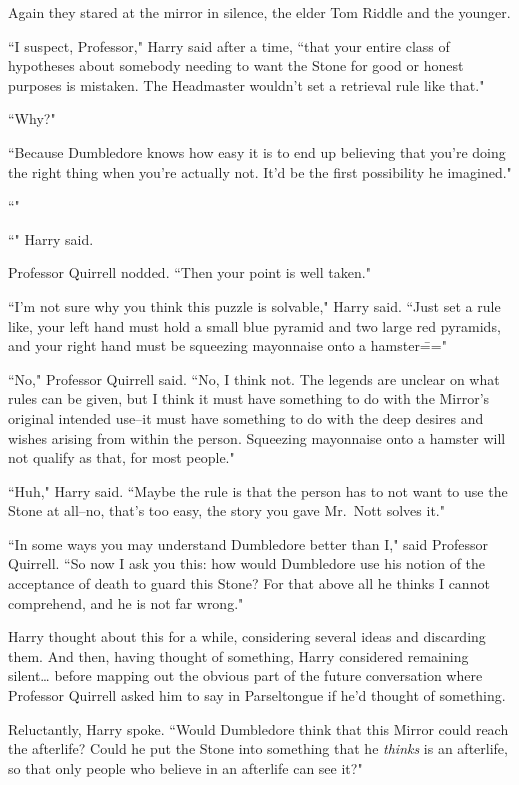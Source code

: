 Again they stared at the mirror in silence, the elder Tom Riddle and the younger.

``I suspect, Professor," Harry said after a time, ``that your entire class of hypotheses about somebody needing to want the Stone for good or honest purposes is mistaken. The Headmaster wouldn't set a retrieval rule like that."

``Why?"

``Because Dumbledore knows how easy it is to end up believing that you're doing the right thing when you're actually not. It'd be the first possibility he imagined."

``"

``" Harry said.

Professor Quirrell nodded. ``Then your point is well taken."

``I'm not sure why you think this puzzle is solvable," Harry said. ``Just set a rule like, your left hand must hold a small blue pyramid and two large red pyramids, and your right hand must be squeezing mayonnaise onto a hamster\==="

``No," Professor Quirrell said. ``No, I think not. The legends are unclear on what rules can be given, but I think it must have something to do with the Mirror's original intended use\---it must have something to do with the deep desires and wishes arising from within the person. Squeezing mayonnaise onto a hamster will not qualify as that, for most people."

``Huh," Harry said. ``Maybe the rule is that the person has to not want to use the Stone at all\---no, that's too easy, the story you gave Mr.~Nott solves it."

``In some ways you may understand Dumbledore better than I," said Professor Quirrell. ``So now I ask you this: how would Dumbledore use his notion of the acceptance of death to guard this Stone? For that above all he thinks I cannot comprehend, and he is not far wrong."

Harry thought about this for a while, considering several ideas and discarding them. And then, having thought of something, Harry considered remaining silent{\ldots} before mapping out the obvious part of the future conversation where Professor Quirrell asked him to say in Parseltongue if he'd thought of something.

Reluctantly, Harry spoke. ``Would Dumbledore think that this Mirror could reach the afterlife? Could he put the Stone into something that he \emph{thinks} is an afterlife, so that only people who believe in an afterlife can see it?"

